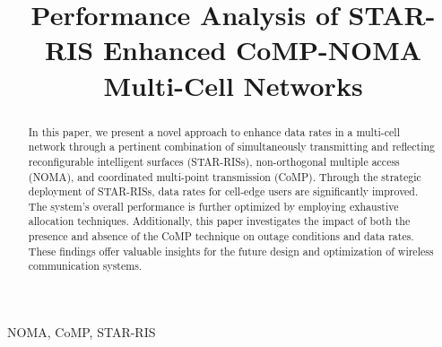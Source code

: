 \documentclass[conference]{IEEEtran}
\begin{document}
\title{Performance Analysis of STAR-RIS Enhanced CoMP-NOMA Multi-Cell Networks}

\author{
}
\maketitle

\begin{abstract}
    In this paper, we present a novel approach to enhance data rates in a multi-cell network through a pertinent combination of simultaneously transmitting and reflecting reconfigurable intelligent surfaces (STAR-RISs), non-orthogonal multiple access (NOMA), and coordinated multi-point transmission (CoMP). Through the strategic deployment of STAR-RISs, data rates for cell-edge users are significantly improved. The system's overall performance is further optimized by employing exhaustive allocation techniques. Additionally, this paper investigates the impact of both the presence and absence of the CoMP technique on outage conditions and data rates. These findings offer valuable insights for the future design and optimization of wireless communication systems.
\end{abstract}

\begin{IEEEkeywords}
    NOMA, CoMP, STAR-RIS
\end{IEEEkeywords}
\end{document}
